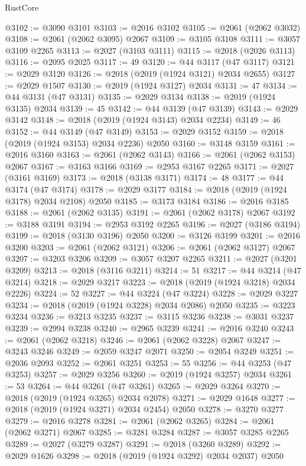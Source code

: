 \begin{lexlean}{RustCore}
\begin{coremodule}
@3102 := @3090 @3101
@3103 := @2016 @3102
@3105 := @2061 (@2062 @3032)
@3108 := @2061 (@2062 @3095) @2067
@3109 := @3105 @3108
@3111 := @3057 @3109 @2265
@3113 := @2027 (@3103 @3111)
@3115 := @2018 (@2026 @3113)
@3116 := @2095 @2025
@3117 := 49
@3120 := @44 @3117 (@47 @3117)
@3121 := @2029 @3120
@3126 := @2018 (@2019 (@1924 @3121) @2034 @2655)
@3127 := @2029 @1507
@3130 := @2019 (@1924 @3127) @2034
@3131 := 47
@3134 := @44 @3131 (@47 @3131)
@3135 := @2029 @3134
@3138 := @2019 (@1924 @3135) @2034
@3139 := 45
@3142 := @44 @3139 (@47 @3139)
@3143 := @2029 @3142
@3148 := @2018 (@2019 (@1924 @3143) @2034 @2234)
@3149 := 46
@3152 := @44 @3149 (@47 @3149)
@3153 := @2029 @3152
@3159 := @2018 (@2019 (@1924 @3153) @2034 @2236) @2050
@3160 := @3148 @3159
@3161 := @2016 @3160
@3163 := @2061 (@2062 @3143)
@3166 := @2061 (@2062 @3153) @2067
@3167 := @3163 @3166
@3169 := @2953 @3167 @2265
@3171 := @2027 (@3161 @3169)
@3173 := @2018 (@3138 @3171)
@3174 := 48
@3177 := @44 @3174 (@47 @3174)
@3178 := @2029 @3177
@3184 := @2018 (@2019 (@1924 @3178) @2034 @2108) @2050
@3185 := @3173 @3184
@3186 := @2016 @3185
@3188 := @2061 (@2062 @3135)
@3191 := @2061 (@2062 @3178) @2067
@3192 := @3188 @3191
@3194 := @2953 @3192 @2265
@3196 := @2027 (@3186 @3194)
@3199 := @2018 (@3130 @3196) @2050
@3200 := @3126 @3199
@3201 := @2016 @3200
@3203 := @2061 (@2062 @3121)
@3206 := @2061 (@2062 @3127) @2067
@3207 := @3203 @3206
@3209 := @3057 @3207 @2265
@3211 := @2027 (@3201 @3209)
@3213 := @2018 (@3116 @3211)
@3214 := 51
@3217 := @44 @3214 (@47 @3214)
@3218 := @2029 @3217
@3223 := @2018 (@2019 (@1924 @3218) @2034 @2226)
@3224 := 52
@3227 := @44 @3224 (@47 @3224)
@3228 := @2029 @3227
@3234 := @2018 (@2019 (@1924 @3228) @2034 @2086) @2050
@3235 := @3223 @3234
@3236 := @3213 @3235
@3237 := @3115 @3236
@3238 := @3031 @3237
@3239 := @2994 @3238
@3240 := @2965 @3239
@3241 := @2016 @3240
@3243 := @2061 (@2062 @3218)
@3246 := @2061 (@2062 @3228) @2067
@3247 := @3243 @3246
@3249 := @2059 @3247 @2071
@3250 := @2054 @3249
@3251 := @2036 @2093
@3252 := @2061 @3251
@3253 := 55
@3256 := @44 @3253 (@47 @3253)
@3257 := @2029 @3256
@3260 := @2019 (@1924 @3257) @2034
@3261 := 53
@3264 := @44 @3261 (@47 @3261)
@3265 := @2029 @3264
@3270 := @2018 (@2019 (@1924 @3265) @2034 @2078)
@3271 := @2029 @1648
@3277 := @2018 (@2019 (@1924 @3271) @2034 @2454) @2050
@3278 := @3270 @3277
@3279 := @2016 @3278
@3281 := @2061 (@2062 @3265)
@3284 := @2061 (@2062 @3271) @2067
@3285 := @3281 @3284
@3287 := @3057 @3285 @2265
@3289 := @2027 (@3279 @3287)
@3291 := @2018 (@3260 @3289)
@3292 := @2029 @1626
@3298 := @2018 (@2019 (@1924 @3292) @2034 @2037) @2050

\end{coremodule}
\end{lexlean}
